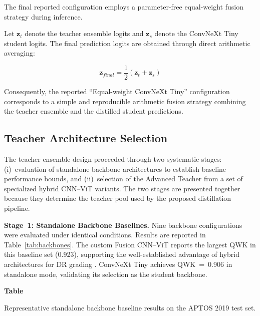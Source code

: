 \documentclass[a4paper,fleqn]{cas-dc}
\newcommand{\lefttablecaption}[2]{%
  \refstepcounter{table}\label{#1}%
  {\raggedright
  \textbf{Table~\thetable}\par\vspace{-2pt}
  #2\par}
}
\begin{document}
The final reported configuration employs a parameter-free equal-weight fusion strategy during inference.

Let $\mathbf{z}_t$ denote the teacher ensemble logits and $\mathbf{z}_s$ denote the ConvNeXt Tiny student logits. The final prediction logits are obtained through direct arithmetic averaging:

\[
\mathbf{z}_{final} =
\frac{1}{2}(\mathbf{z}_t + \mathbf{z}_s)
\]

Consequently, the reported ``Equal-weight ConvNeXt Tiny'' configuration corresponds to a simple and reproducible arithmetic fusion strategy combining the teacher ensemble and the distilled student predictions.

\subsection{Teacher Architecture Selection}
\label{sec:teacher_selection}

The teacher ensemble design proceeded through two systematic stages: (i)~evaluation of standalone backbone architectures to establish baseline performance bounds, and (ii)~selection of the Advanced Teacher from a set of specialized hybrid CNN--ViT variants. The two stages are presented together because they determine the teacher pool used by the proposed distillation pipeline.

\textbf{Stage~1: Standalone Backbone Baselines.} Nine backbone configurations were evaluated under identical conditions. Results are reported in Table~\ref{tab:backbones}. The custom Fusion CNN--ViT reports the largest QWK in this baseline set (0.923), supporting the well-established advantage of hybrid architectures for DR grading \cite{zhang2025}. ConvNeXt Tiny achieves QWK~=~0.906 in standalone mode, validating its selection as the student backbone.

\begin{table}
\lefttablecaption{tab:backbones}{Representative standalone backbone baseline results on the APTOS 2019 test set.}
\raggedright
\small
{}
\end{table}
\end{document}
